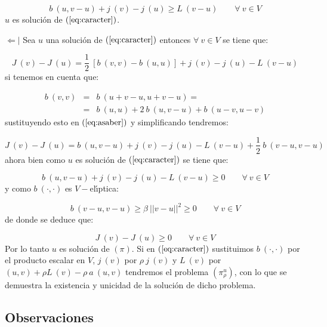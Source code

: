 \begin{demoslema}
\begin{displaymath}
b\ (u,v-u)+j\ (v)-j\ (u) \ge L\ (v-u)\qquad \forall \ v \in V
\end{displaymath}
$u$ es soluci\'on de $(\ref{eq:caracter})$.\newline

$\Leftarrow |$ Sea $u$ una soluci\'on de $(\ref{eq:caracter})$ entonces 
$\forall \ v \in V$ se tiene que:

\begin{equation} \label{eq:asaber}
J\ (v)-J\ (u) = \frac{1}{2}\ [b\ (v,v)-b\ (u,u)]+j\ (v)-j\ (u)-L\ (v-u)
\end{equation}
si tenemos en cuenta que:

\begin{eqnarray*}
b\ (v,v) &=& b\ (u+v-u,u+v-u)=\\
&=& b\ (u,u)+2\ b\ (u,v-u)+b\ (u-v,u-v)
\end{eqnarray*}
sustituyendo esto en $(\ref{eq:asaber})$ y simplificando tendremos:

\begin{displaymath}
J\ (v)-J\ (u) = b\ (u,v-u)+j\ (v)-j\ (u)-L\ (v-u) +\frac{1}{2}\ b\ (v-u,v-u)
\end{displaymath}
ahora bien como $u$ es soluci\'on de $(\ref{eq:caracter})$ se tiene que:

\begin{displaymath}
b\ (u,v-u)+j\ (v)-j\ (u)-L\ (v-u) \ge 0\qquad \forall \ v \in V
\end{displaymath}
y como $b\ (\cdot ,\cdot )$ es $V-$el\'{\i}ptica:

\begin{displaymath}
b\ (v-u,v-u) \ge \beta \ ||v-u||^2 \ge 0\qquad \forall \ v \in V
\end{displaymath}
de donde se deduce que:

\begin{displaymath}
J\ (v) - J\ (u) \ge 0\qquad \forall \ v \in V
\end{displaymath}
Por lo tanto $u$ es soluci\'on de $(\pi )$. Si en $(\ref{eq:caracter})$
sustituimos $b\ (\cdot ,\cdot )$ por el producto escalar en $V$, $j\ (v)$ por
$\rho \ j\ (v)$ y $L\ (v)$ por $(u,v)+\rho L\ (v)-\rho \ a\ (u,v)$ tendremos el
problema $(\pi_{\rho}^u)$, con lo que se demuestra la existencia y unicidad de
la soluci\'on de dicho problema.

\end{demoslema}

\subsection{Observaciones}

